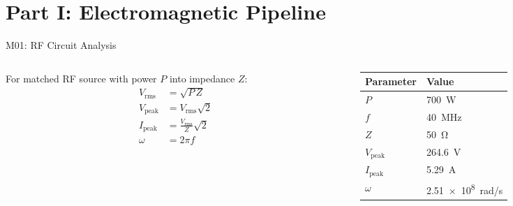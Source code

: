 \documentclass[aspectratio=169,10pt]{beamer}
\begin{document}
\section{Part I: Electromagnetic Pipeline}

\begin{frame}{M01: RF Circuit Analysis}
  \begin{columns}[T]
    \begin{column}{0.55\textwidth}
      For matched RF source with power $P$ into impedance $Z$:
      \begin{align}
        V_\text{rms} &= \sqrt{P\,Z} \\
        V_\text{peak} &= V_\text{rms}\sqrt{2} \\
        I_\text{peak} &= \frac{V_\text{rms}}{Z}\sqrt{2} \\
        \omega &= 2\pi f
      \end{align}
    \end{column}
    \begin{column}{0.42\textwidth}
      \centering
      \footnotesize
      \begin{tabular}{@{}ll@{}}
        \toprule
        Parameter & Value \\
        \midrule
        $P$ & \SI{700}{\watt} \\
        $f$ & \SI{40}{\mega\hertz} \\
        $Z$ & \SI{50}{\ohm} \\
        \midrule
        $V_\text{peak}$ & \SI{264.6}{\volt} \\
        $I_\text{peak}$ & \SI{5.29}{\ampere} \\
        $\omega$ & \SI{2.51e8}{\radian/\second} \\
        \bottomrule
      \end{tabular}
    \end{column}
  \end{columns}
\end{frame}
\end{document}
